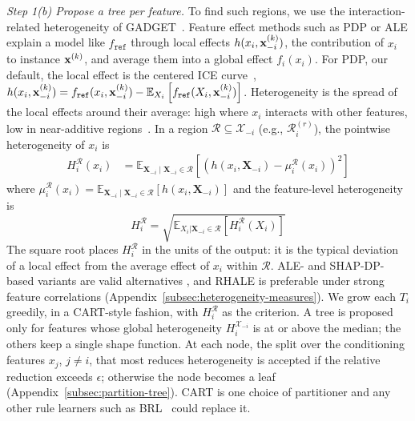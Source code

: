 \textit{Step 1(b) Propose a tree per feature.}
To find such regions, we use the interaction-related heterogeneity of GADGET~\cite{herbinger2024GADGET}.
Feature effect methods such as PDP or ALE explain a model like $f_{\texttt{ref}}$ through local effects \(h(x_i, \mathbf{x}_{-i}^{(k)})\), the contribution of $x_i$ to instance $\mathbf{x}^{(k)}$, and average them into a global effect $f_i(x_i)$.
For PDP, our default, the local effect is the centered ICE curve~\cite{goldstein2015peeking}, \(h(x_i, \mathbf{x}_{-i}^{(k)}) = f_{\texttt{ref}}(x_i, \mathbf{x}_{-i}^{(k)}) - \mathbb{E}_{X_i}\left[f_{\texttt{ref}}(X_i, \mathbf{x}_{-i}^{(k)})\right]\).
Heterogeneity is the spread of the local effects around their average: high where $x_i$ interacts with other features, low in near-additive regions~\cite{heiss2026sails}.
In a region \(\mathcal{R} \subseteq \mathcal{X}_{-i}\) (e.g., \(\mathcal{R}_i^{(r)}\)), the pointwise heterogeneity of $x_i$ is
\begin{equation}
\begin{aligned}
H_i^{\mathcal{R}}(x_i) &= \mathbb{E}_{\mathbf{X}_{-i}\mid \mathbf{X}_{-i} \in \mathcal{R}}\left[\left ( h(x_i , \mathbf{X}_{-i}) - \mu_i^{\mathcal{R}}(x_i) \right )^2\right]
\end{aligned}
\label{eq:pointwiseh}
\end{equation}
where $\mu_i^{\mathcal{R}}(x_i) = \mathbb{E}_{\mathbf{X}_{-i}\mid \mathbf{X}_{-i} \in \mathcal{R}}\left[h(x_i , \mathbf{X}_{-i})\right]$ and the feature-level heterogeneity is
\begin{equation}
    H^{\mathcal{R}}_i=\sqrt{\mathbb{E}_{X_i|\mathbf{X}_{-i}\in \mathcal{R}}\left[H_i^{\mathcal{R}}(X_i)\right]}
    \label{eq:heterogeneity}
\end{equation}
The square root places $H^{\mathcal{R}}_i$ in the units of the output: it is the typical deviation of a local effect from the average effect of $x_i$ within $\mathcal{R}$.
ALE- and SHAP-DP-based variants are valid alternatives \citep{herbinger2022REPID, herbinger2024GADGET}, and RHALE \citep{gkolemis2023rhale} is preferable under strong feature correlations (Appendix~\ref{subsec:heterogeneity-measures}).
We grow each $T_i$ greedily, in a CART-style fashion, with $H_i^{\mathcal{R}}$ as the criterion.
A tree is proposed only for features whose global heterogeneity $H_i^{\mathcal{X}_{-i}}$ is at or above the median; the others keep a single shape function.
At each node, the split over the conditioning features $x_j$, $j \neq i$, that most reduces heterogeneity is accepted if the relative reduction exceeds $\epsilon$; otherwise the node becomes a leaf (Appendix~\ref{subsec:partition-tree}).
CART is one choice of partitioner and any other rule learners such as BRL~\citep{letham2015stroke} could replace it.

